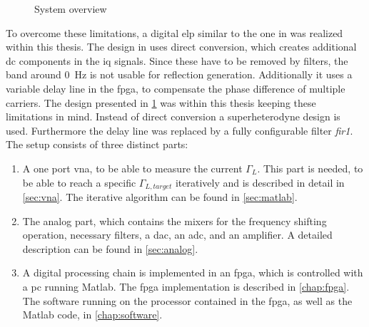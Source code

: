 \documentclass[12pt,a4paper,parskip=full,abstract=true,BCOR=10mm,twoside,open=right]{scrreprt}
\def\device#1{\textit{#1}}
\begin{document}
\begin{figure}[htb]
{
    }
    \caption{System overview}
    \label{fig:overall_hf}
\end{figure}

To overcome these limitations, a digital \gls{elp} similar to the one in
\cite{hashim_active_2008} was realized within this thesis. The design in \cite{hashim_active_2008}
uses direct conversion, which creates additional \gls{dc} components in the \gls{iq}
signals. Since these have to be removed by filters, the band around \SI{0}{\hertz} is
not usable for reflection generation. Additionally it uses a variable delay line in
the \gls{fpga}, to compensate the phase difference of multiple carriers. The design presented in
\cref{fig:overall_hf} was within this thesis keeping these limitations in mind. Instead of direct
conversion a superheterodyne design is used. Furthermore the delay line was replaced by
a fully configurable filter \device{fir1}. The setup consists of three distinct parts:

\begin{enumerate}
    \item A one port \gls{vna}, to be able to measure the current $\Gamma_L$. This part is
needed, to be able to reach a specific $\Gamma_{L,target}$ iteratively and is
described in detail in \cref{sec:vna}. The iterative algorithm can be found
in \cref{sec:matlab}.
    \item The analog part, which contains the mixers for the frequency shifting operation, necessary
        filters, a \gls{dac}, an \gls{adc}, and an amplifier. A detailed description can be found
        in \cref{sec:analog}.
    \item A digital processing chain is implemented in an \gls{fpga}, which is controlled with
a \gls{pc} running Matlab. The \gls{fpga} implementation is described in \cref{chap:fpga}.
The software running on the processor contained in the \gls{fpga}, as well as the Matlab
code, in \cref{chap:software}.
\end{enumerate}
\end{document}
